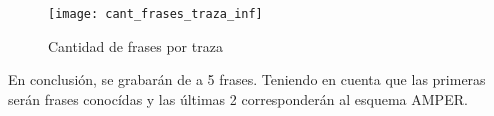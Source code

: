 \begin{figure}[h!]
    \centerline{\texttt{[image: cant\_frases\_traza\_inf]} }
    \caption{Cantidad de frases por traza}
    \label{figFracesTraza}
\end{figure}

En conclusión, se grabarán de a 5 frases. Teniendo en cuenta que las primeras serán frases conocídas y las últimas 2 corresponderán al esquema AMPER. 
